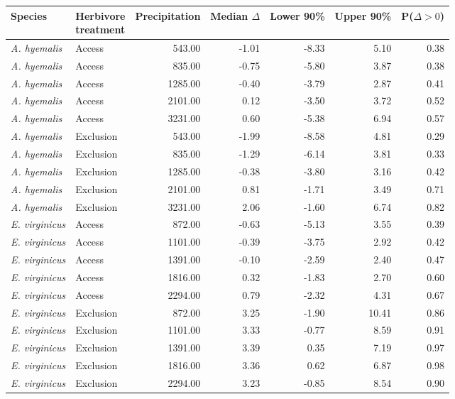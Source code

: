 \begin{tabular}{llrrrrr}
  \hline
Species & \makecell{Herbivore \\ treatment} & Precipitation & Median $\Delta$ & Lower 90\% & Upper 90\% & P($\Delta>0$) \\ 
  \hline
\textit{A. hyemalis} & Access & 543.00 & -1.01 & -8.33 & 5.10 & 0.38 \\ 
  \textit{A. hyemalis} & Access & 835.00 & -0.75 & -5.80 & 3.87 & 0.38 \\ 
  \textit{A. hyemalis} & Access & 1285.00 & -0.40 & -3.79 & 2.87 & 0.41 \\ 
  \textit{A. hyemalis} & Access & 2101.00 & 0.12 & -3.50 & 3.72 & 0.52 \\ 
  \textit{A. hyemalis} & Access & 3231.00 & 0.60 & -5.38 & 6.94 & 0.57 \\ 
  \textit{A. hyemalis} & Exclusion & 543.00 & -1.99 & -8.58 & 4.81 & 0.29 \\ 
  \textit{A. hyemalis} & Exclusion & 835.00 & -1.29 & -6.14 & 3.81 & 0.33 \\ 
  \textit{A. hyemalis} & Exclusion & 1285.00 & -0.38 & -3.80 & 3.16 & 0.42 \\ 
  \textit{A. hyemalis} & Exclusion & 2101.00 & 0.81 & -1.71 & 3.49 & 0.71 \\ 
  \textit{A. hyemalis} & Exclusion & 3231.00 & 2.06 & -1.60 & 6.74 & 0.82 \\ 
  \textit{E. virginicus} & Access & 872.00 & -0.63 & -5.13 & 3.55 & 0.39 \\ 
  \textit{E. virginicus} & Access & 1101.00 & -0.39 & -3.75 & 2.92 & 0.42 \\ 
  \textit{E. virginicus} & Access & 1391.00 & -0.10 & -2.59 & 2.40 & 0.47 \\ 
  \textit{E. virginicus} & Access & 1816.00 & 0.32 & -1.83 & 2.70 & 0.60 \\ 
  \textit{E. virginicus} & Access & 2294.00 & 0.79 & -2.32 & 4.31 & 0.67 \\ 
  \textit{E. virginicus} & Exclusion & 872.00 & 3.25 & -1.90 & 10.41 & 0.86 \\ 
  \textit{E. virginicus} & Exclusion & 1101.00 & 3.33 & -0.77 & 8.59 & 0.91 \\ 
  \textit{E. virginicus} & Exclusion & 1391.00 & 3.39 & 0.35 & 7.19 & 0.97 \\ 
  \textit{E. virginicus} & Exclusion & 1816.00 & 3.36 & 0.62 & 6.87 & 0.98 \\ 
  \textit{E. virginicus} & Exclusion & 2294.00 & 3.23 & -0.85 & 8.54 & 0.90 \\ 
   \hline
\end{tabular}